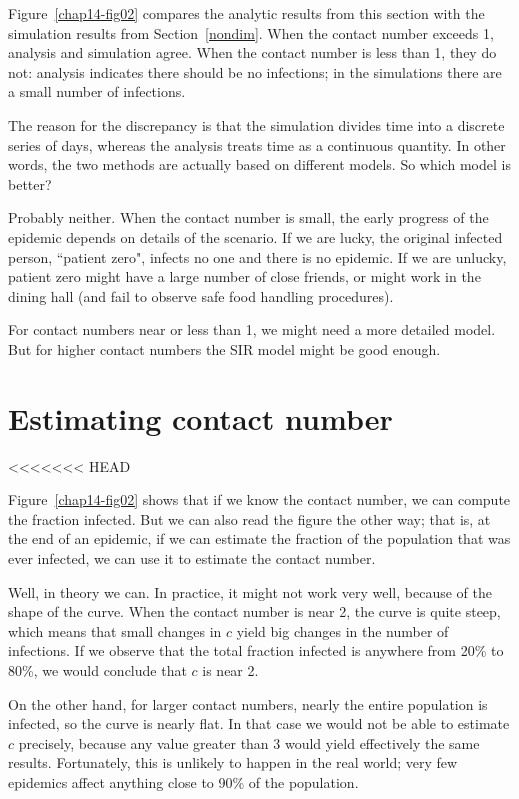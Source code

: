\documentclass[12pt]{book}
\theoremstyle{exercise}
\begin{document}
Figure~\ref{chap14-fig02} compares the analytic results from this section with the simulation results from Section~\ref{nondim}.  When the contact number exceeds 1, analysis and simulation agree.
When the contact number is less than 1, they do not: analysis indicates there should be no infections; in the simulations there are a small number of infections.

The reason for the discrepancy is that the simulation divides time into a discrete series of days, whereas the analysis treats time as a continuous quantity.  In other words, the two methods are actually based on different models.  So which model is better?

Probably neither.  When the contact number is small, the early progress of the epidemic depends on details of the scenario.  If we are lucky, the original infected person, ``patient zero",  infects no one and there is no epidemic.  If we are unlucky, patient zero might have a large number of close friends, or might work in the dining hall (and fail to observe safe food handling procedures).

For contact numbers near or less than 1, we might need a more detailed model.  But for higher contact numbers the SIR model might be good enough.

\section{Estimating contact number}
<<<<<<< HEAD

Figure~\ref{chap14-fig02} shows that if we know the contact number, we can compute the fraction infected.  But we can also read the figure the other way; that is, at the end of an epidemic, if we can estimate the fraction of the population that was ever infected, we can use it to estimate the contact number.

Well, in theory we can.  In practice, it might not work very well, because of the shape of the curve.  When the contact number is near 2, the curve is quite steep, which means that small changes in $c$ yield big changes in the number of infections.  If we observe that the total fraction infected is anywhere from 20\% to 80\%, we would conclude that $c$ is near 2.

On the other hand, for larger contact numbers, nearly the entire population is infected, so the curve is nearly flat.  In that case we would not be able to estimate $c$ precisely, because any value greater than 3 would yield effectively the same results.  Fortunately, this is unlikely to happen in the real world; very few epidemics affect anything close to 90\% of the population.
\end{document}

